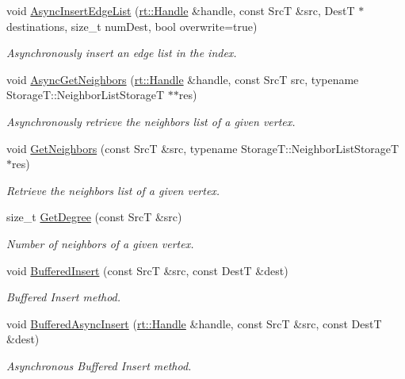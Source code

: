 \begin{DoxyCompactItemize}
void \hyperlink{classshad_1_1EdgeIndex_ad27778c664727b3784988250c5623ab6}{Async\-Insert\-Edge\-List} (\hyperlink{classshad_1_1rt_1_1Handle}{rt\-::\-Handle} \&handle, const Src\-T \&src, Dest\-T $\ast$destinations, size\-\_\-t num\-Dest, bool overwrite=true)
\begin{DoxyCompactList}\small\item\em Asynchronously insert an edge list in the index. \end{DoxyCompactList}\item 
void \hyperlink{classshad_1_1EdgeIndex_a9d9a45b30b9a274674e8180d6468f6cc}{Async\-Get\-Neighbors} (\hyperlink{classshad_1_1rt_1_1Handle}{rt\-::\-Handle} \&handle, const Src\-T src, typename Storage\-T\-::\-Neighbor\-List\-Storage\-T $\ast$$\ast$res)
\begin{DoxyCompactList}\small\item\em Asynchronously retrieve the neighbors list of a given vertex. \end{DoxyCompactList}\item 
void \hyperlink{classshad_1_1EdgeIndex_a8b7bc20d65a535f0ec1b568d7cbbca4b}{Get\-Neighbors} (const Src\-T \&src, typename Storage\-T\-::\-Neighbor\-List\-Storage\-T $\ast$res)
\begin{DoxyCompactList}\small\item\em Retrieve the neighbors list of a given vertex. \end{DoxyCompactList}\item 
size\-\_\-t \hyperlink{classshad_1_1EdgeIndex_a39bf8088eb8689211e0273dc1d7e3b3a}{Get\-Degree} (const Src\-T \&src)
\begin{DoxyCompactList}\small\item\em Number of neighbors of a given vertex. \end{DoxyCompactList}\item 
void \hyperlink{classshad_1_1EdgeIndex_a1b2fbd03993f2687ca92b91e22667bb3}{Buffered\-Insert} (const Src\-T \&src, const Dest\-T \&dest)
\begin{DoxyCompactList}\small\item\em Buffered Insert method. \end{DoxyCompactList}\item 
void \hyperlink{classshad_1_1EdgeIndex_aaad1cccd3da96c4e957fad51f4b60f5d}{Buffered\-Async\-Insert} (\hyperlink{classshad_1_1rt_1_1Handle}{rt\-::\-Handle} \&handle, const Src\-T \&src, const Dest\-T \&dest)
\begin{DoxyCompactList}\small\item\em Asynchronous Buffered Insert method. \end{DoxyCompactList}\item 
$$
\end{DoxyCompactItemize}
